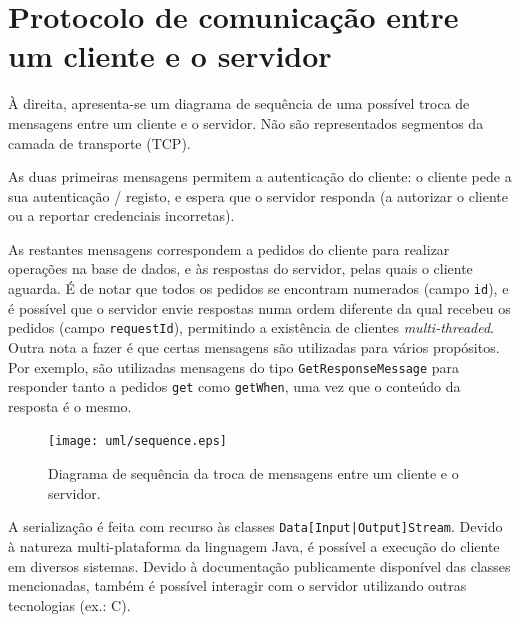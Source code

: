 \documentclass[11pt, a4paper]{article}
\begin{document}
\section{Protocolo de comunicação entre um cliente e o servidor}

\begin{minipage}{0.5\textwidth}
    \setlength{\parskip}{\baselineskip}
    \setlength{\parindent}{0pt}

    À direita, apresenta-se um diagrama de sequência de uma possível troca de mensagens entre um
    cliente e o servidor. Não são representados segmentos da camada de transporte (TCP).

    As duas primeiras mensagens permitem a autenticação do cliente: o cliente pede a sua
    autenticação / registo, e espera que o servidor responda (a autorizar o cliente ou a reportar
    credenciais incorretas).

    As restantes mensagens correspondem a pedidos do cliente para realizar operações na base de
    dados, e às respostas do servidor, pelas quais o cliente aguarda. É de notar que todos os
    pedidos se encontram numerados (campo \texttt{id}), e é possível que o servidor envie respostas
    numa ordem diferente da qual recebeu os pedidos (campo \texttt{requestId}), permitindo a
    existência de clientes \emph{multi-threaded}. Outra nota a fazer é que certas mensagens são
    utilizadas para vários propósitos. Por exemplo, são utilizadas mensagens do tipo
    \texttt{GetResponseMessage} para responder tanto a pedidos \texttt{get} como \texttt{getWhen},
    uma vez que o conteúdo da resposta é o mesmo.
\end{minipage}
\hspace{0.03\textwidth}
\begin{minipage}{0.47\textwidth}
    \begin{figure}[H]
        \centering
        \texttt{[image: uml/sequence.eps]}
        \caption{Diagrama de sequência da troca de mensagens entre um cliente e o servidor.}
        \label{sequence}
    \end{figure}
\end{minipage}

A serialização é feita com recurso às classes \texttt{Data[Input|Output]Stream}. Devido à natureza
multi-plataforma da linguagem Java, é possível a execução do cliente em diversos sistemas. Devido à
documentação publicamente disponível das classes mencionadas, também é possível interagir com o
servidor utilizando outras tecnologias (ex.: C).
\end{document}
